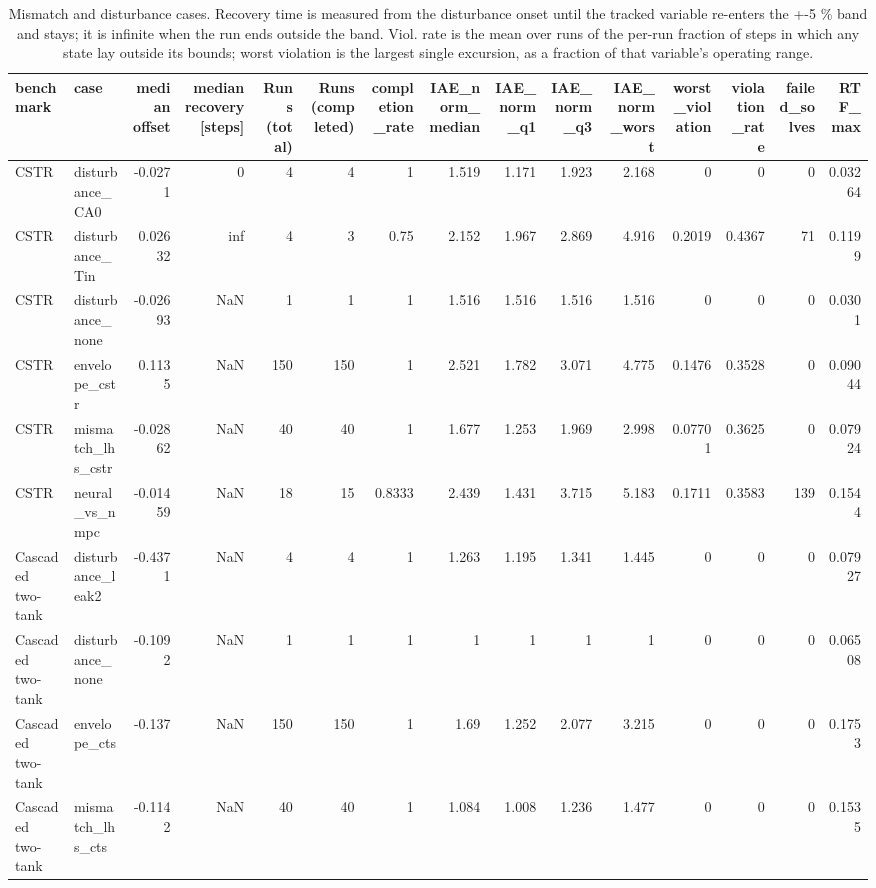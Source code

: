 \begin{table}
\caption{Mismatch and disturbance cases. Recovery time is measured from the disturbance onset until the tracked variable re-enters the +-5 \% band and stays; it is infinite when the run ends outside the band. Viol. rate is the mean over runs of the per-run fraction of steps in which any state lay outside its bounds; worst violation is the largest single excursion, as a fraction of that variable's operating range.}
\label{tab:T3_mismatch_and_disturbance_cases}
\begin{tabular}{llrrrrrrrrrrrrr}
\toprule
benchmark & case & median offset & median recovery [steps] & Runs (total) & Runs (completed) & completion\_rate & IAE\_norm\_median & IAE\_norm\_q1 & IAE\_norm\_q3 & IAE\_norm\_worst & worst\_violation & violation\_rate & failed\_solves & RTF\_max \\
\midrule
CSTR & disturbance\_CA0 & -0.0271 & 0 & 4 & 4 & 1 & 1.519 & 1.171 & 1.923 & 2.168 & 0 & 0 & 0 & 0.03264 \\
CSTR & disturbance\_Tin & 0.02632 & inf & 4 & 3 & 0.75 & 2.152 & 1.967 & 2.869 & 4.916 & 0.2019 & 0.4367 & 71 & 0.1199 \\
CSTR & disturbance\_none & -0.02693 & NaN & 1 & 1 & 1 & 1.516 & 1.516 & 1.516 & 1.516 & 0 & 0 & 0 & 0.0301 \\
CSTR & envelope\_cstr & 0.1135 & NaN & 150 & 150 & 1 & 2.521 & 1.782 & 3.071 & 4.775 & 0.1476 & 0.3528 & 0 & 0.09044 \\
CSTR & mismatch\_lhs\_cstr & -0.02862 & NaN & 40 & 40 & 1 & 1.677 & 1.253 & 1.969 & 2.998 & 0.07701 & 0.3625 & 0 & 0.07924 \\
CSTR & neural\_vs\_nmpc & -0.01459 & NaN & 18 & 15 & 0.8333 & 2.439 & 1.431 & 3.715 & 5.183 & 0.1711 & 0.3583 & 139 & 0.1544 \\
Cascaded two-tank & disturbance\_leak2 & -0.4371 & NaN & 4 & 4 & 1 & 1.263 & 1.195 & 1.341 & 1.445 & 0 & 0 & 0 & 0.07927 \\
Cascaded two-tank & disturbance\_none & -0.1092 & NaN & 1 & 1 & 1 & 1 & 1 & 1 & 1 & 0 & 0 & 0 & 0.06508 \\
Cascaded two-tank & envelope\_cts & -0.137 & NaN & 150 & 150 & 1 & 1.69 & 1.252 & 2.077 & 3.215 & 0 & 0 & 0 & 0.1753 \\
Cascaded two-tank & mismatch\_lhs\_cts & -0.1142 & NaN & 40 & 40 & 1 & 1.084 & 1.008 & 1.236 & 1.477 & 0 & 0 & 0 & 0.1535 \\
\bottomrule
\end{tabular}
\end{table}
